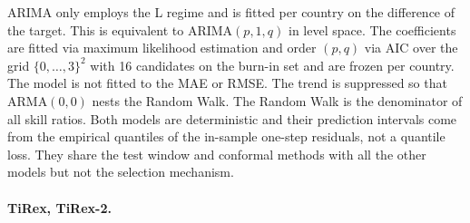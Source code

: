 
ARIMA only employs the L regime and is fitted per country on the difference of the target. This is equivalent to ARIMA$(p,1,q)$ in level space. The coefficients are fitted via maximum likelihood estimation and order $(p,q)$ via AIC over the grid $\{0,\dots,3\}^2$ with 16 candidates on the burn-in set and are frozen per country. The model is not fitted to the MAE or RMSE. The trend is suppressed so that ARMA$(0,0)$ nests the Random Walk. The Random Walk is the denominator of all skill ratios. Both models are deterministic and their prediction intervals come from the empirical quantiles of the in-sample one-step residuals, not a quantile loss. They share the test window and conformal methods with all the other models but not the selection mechanism.



\paragraph{TiRex, TiRex-2.}


